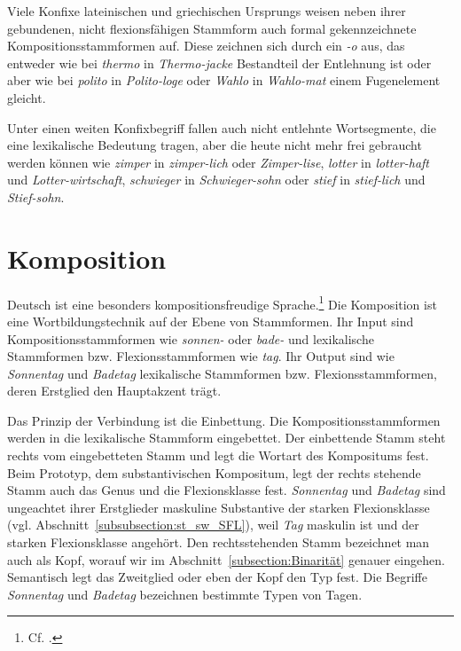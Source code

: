 Viele Konfixe lateinischen und griechischen Ursprungs weisen neben ihrer gebundenen, nicht flexionsfähigen Stammform auch formal gekennzeichnete Kompositionsstammformen auf. Diese zeichnen sich durch ein \textit{-o} aus, das entweder wie bei \textit{thermo} in \textit{Thermo-jacke} Bestandteil der Entlehnung ist oder aber wie bei \textit{polito} in \textit{Polito-loge} oder \textit{Wahlo} in \textit{Wahlo-mat} einem Fugenelement gleicht. 

Unter einen weiten Konfixbegriff fallen auch nicht entlehnte Wortsegmente, die eine lexikalische Bedeutung tragen, aber die heute nicht mehr frei gebraucht werden können wie \textit{zimper} in \textit{zimper-lich} oder \textit{Zimper-lise}, \textit{lotter} in \textit{lotter-haft} und \textit{Lotter-wirtschaft}, \textit{schwieger} in \textit{Schwieger-sohn} oder \textit{stief} in \textit{stief-lich} und \textit{Stief-sohn}.


\section{Komposition}\label{section:Komposition}

Deutsch ist eine besonders kompositionsfreudige Sprache.\footnote{Cf. \citet[2]{Schluecker2012}.} Die Komposition ist eine Wortbildungstechnik auf der Ebene von Stammformen. Ihr Input sind Kompositionsstammformen wie \textit{sonnen-} oder \textit{bade-} und lexikalische Stammformen bzw. Flexionsstammformen wie \textit{tag}. Ihr Output sind wie \textit{Sonnentag} und \textit{Badetag} lexikalische Stammformen bzw. Flexionsstammformen, deren Erstglied den Hauptakzent trägt.

Das Prinzip der Verbindung ist die Einbettung. Die Kompositionsstammformen werden in die lexikalische Stammform eingebettet. Der einbettende Stamm steht rechts vom eingebetteten Stamm und legt die Wortart des Kompositums fest. Beim Prototyp, dem substantivischen Kompositum, legt der rechts stehende Stamm auch das Genus und die Flexionsklasse fest. \textit{Sonnentag} und \textit{Badetag} sind ungeachtet ihrer Erstglieder maskuline Substantive der starken Flexionsklasse (vgl. Abschnitt~\ref{subsubsection:st_sw_SFL}), weil \textit{Tag} maskulin ist und der starken Flexionsklasse angehört. Den rechtsstehenden Stamm bezeichnet man auch als Kopf, worauf wir im Abschnitt~\ref{subsection:Binarität} genauer eingehen. Semantisch legt das Zweitglied oder eben der Kopf den Typ fest. Die Begriffe \textit{Sonnentag} und \textit{Badetag} bezeichnen bestimmte Typen von Tagen.  

